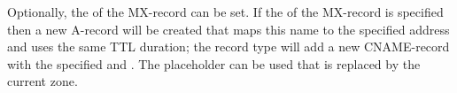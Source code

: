 Optionally, the 
of the MX-record can be set. If the  of the MX-record is 
specified then a new A-record will be created that maps this name to the 
specified address and uses the same TTL duration;
the  record type will add
a new CNAME-record with the specified  and .
The placeholder \qcode{\%} can be used that is replaced by the current zone.
